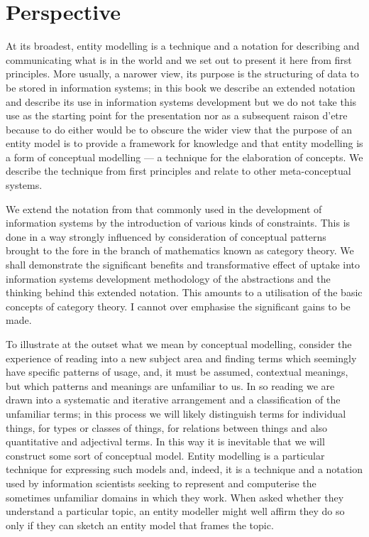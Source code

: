 \section{Perspective}
\label{Perspective}
At its broadest, entity modelling is a technique and a notation for describing and communicating what is in the world and we set out to present it here from first principles. More usually, a narower view, its purpose is the structuring of data to be stored in information systems; in this book we describe an extended notation and describe its use in information systems development but we do not take this use as the starting point for the presentation nor as a subsequent raison d'etre because to do either would be to obscure the wider view that the purpose of an entity model is to provide a framework for knowledge and that entity modelling is a form of conceptual modelling — a technique for the elaboration of concepts. We describe the technique from first principles and relate to other meta-conceptual systems. 

We extend the notation from that commonly used in the development of information systems by the introduction of various kinds of constraints. This is done in a way strongly influenced by consideration of conceptual patterns brought to the fore in the branch of mathematics known as category theory. We shall demonstrate the significant benefits and transformative effect
of uptake into information systems development methodology of the abstractions and the thinking behind this extended notation. This amounts to a utilisation of the basic concepts of category theory. I cannot over emphasise the significant gains to be made.

To illustrate at the outset what we mean by conceptual modelling, consider the experience of reading into a new subject area and finding terms which seemingly have specific patterns of usage, and, it must be assumed, contextual meanings, but which patterns and meanings are unfamiliar to us. In so reading we are drawn into a systematic and iterative arrangement and a classification of the unfamiliar terms; in this process we will likely distinguish terms for individual things, for types or classes of things, for relations between things and also quantitative and adjectival terms. In this way it is inevitable that we will construct some sort of conceptual model. 
Entity modelling is a particular technique for expressing such models and, indeed, it is a technique and a notation used by information scientists seeking to represent and computerise the sometimes unfamiliar domains in which they work. When asked whether they understand a particular topic, an entity modeller might well affirm they do so only if they can sketch an entity model that frames the topic.

